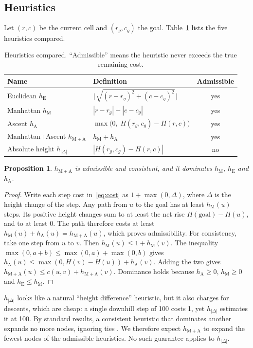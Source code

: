\documentclass[11pt]{article}
\newtheorem{proposition}{Proposition}
\newcommand{\hM}{h_{\mathrm{M}}}
\newcommand{\hE}{h_{\mathrm{E}}}
\newcommand{\hA}{h_{\mathrm{A}}}
\newcommand{\hMA}{h_{\mathrm{M+A}}}
\newcommand{\hAbs}{h_{|\Delta|}}
\begin{document}
\subsection{Heuristics}
Let $(r,c)$ be the current cell and $(r_g,c_g)$ the goal. Table~\ref{tab:heuristics} lists the five heuristics compared.

\begin{table}[t]
\centering
\caption{Heuristics compared. ``Admissible'' means the heuristic never exceeds the true remaining cost.}
\label{tab:heuristics}
\begin{tabular}{llc}
\toprule
Name & Definition & Admissible \\
\midrule
Euclidean $\hE$ & $\lfloor \sqrt{(r-r_g)^2 + (c-c_g)^2} \rfloor$ & yes \\
Manhattan $\hM$ & $|r-r_g| + |c-c_g|$ & yes \\
Ascent $\hA$ & $\max\bigl(0,\; H(r_g,c_g) - H(r,c)\bigr)$ & yes \\
Manhattan+Ascent $\hMA$ & $\hM + \hA$ & yes \\
Absolute height $\hAbs$ & $|H(r_g,c_g) - H(r,c)|$ & no \\
\bottomrule
\end{tabular}
\end{table}

\begin{proposition}
$\hMA$ is admissible and consistent, and it dominates $\hM$, $\hE$ and $\hA$.
\end{proposition}
\begin{proof}
Write each step cost in~\eqref{eq:cost} as $1 + \max(0, \Delta)$, where $\Delta$ is the height change of the step. Any path from $u$ to the goal has at least $\hM(u)$ steps. Its positive height changes sum to at least the net rise $H(\text{goal}) - H(u)$, and to at least 0. The path therefore costs at least $\hM(u) + \hA(u) = \hMA(u)$, which proves admissibility. For consistency, take one step from $u$ to $v$. Then $\hM(u) \le 1 + \hM(v)$. The inequality $\max(0, a+b) \le \max(0,a) + \max(0,b)$ gives $\hA(u) \le \max(0, H(v)-H(u)) + \hA(v)$. Adding the two gives $\hMA(u) \le c(u,v) + \hMA(v)$. Dominance holds because $\hA \ge 0$, $\hM \ge 0$ and $\hE \le \hM$.
\end{proof}

$\hAbs$ looks like a natural ``height difference'' heuristic, but it also charges for descents, which are cheap: a single downhill step of 100 costs 1, yet $\hAbs$ estimates it at 100. By standard results, a consistent heuristic that dominates another expands no more nodes, ignoring ties \citep{pearl1984heuristics,dechter1985generalized}. We therefore expect $\hMA$ to expand the fewest nodes of the admissible heuristics. No such guarantee applies to $\hAbs$.
\end{document}
